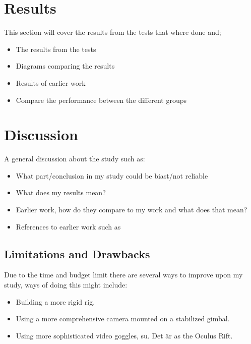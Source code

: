 \documentclass[runningheads,a4paper,oribibl]{llncs}
\begin{document}
\section{Results}
This section will cover the results from the tests that where done and;
\begin{itemize}
	\item The results from the tests
	\item Diagrams comparing the results
	\item Results of earlier work
	\item Compare the performance between the different groups
\end{itemize}












\section{Discussion}
A general discussion about the study such as:
\begin{itemize}
	\item What part/conclusion in my study could be biast/not reliable
	\item What does my results mean?
	\item Earlier work, how do they compare to my work and what does that mean?
	\item References to earlier work such as~\cite{schmierbach2011exploring}
\end{itemize}



\subsection{Limitations and Drawbacks}
Due to the time and budget limit there are several ways to improve upon my study, ways of doing this might include:
\begin{itemize}
	\item Building a more rigid rig.
	\item Using a more comprehensive camera mounted on a stabilized gimbal.
	\item Using more sophisticated video goggles, su. Det är as the Oculus Rift.
\end{itemize}
\end{document}
